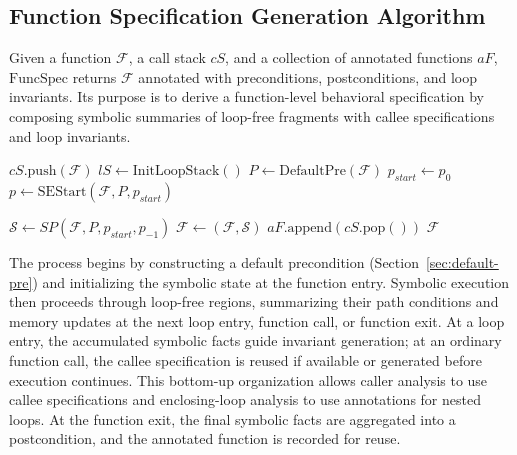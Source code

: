   \subsection{Function Specification Generation Algorithm}
  \label{sec:functionsummary}

  {Given a function $\mathcal F$, a call stack $\textit{cS}$, and a collection of annotated functions $\textit{aF}$, $\mathrm{FuncSpec}$ returns $\mathcal F$ annotated with preconditions, postconditions, and loop invariants. Its purpose is to derive a function-level behavioral specification by composing symbolic summaries of loop-free fragments with callee specifications and loop invariants.}

  \begin{algorithm}[htbp]
  \caption{Function Specification Generation $\mathrm{FuncSpec}$}
  \label{alg:funspec-gen}
  \small


  $\textit{cS}.\mathrm{push}(\mathcal{F})$\;
  $\textit{lS} \gets \mathrm{InitLoopStack}()$\;
  $P \gets \mathrm{DefaultPre}(\mathcal{F})$\;
  $p_{\textit{start}} \gets p_0$\;
  $p \gets \mathrm{SEStart}(\mathcal{F},P, p_{\textit{start}})$\;


  $\mathcal{S} \gets \textit{SP}(\mathcal{F},P,p_{\textit{start}},p_{-1})$\;
  $\mathcal{F} \gets (\mathcal{F},\mathcal{S})$\;
  $\textit{aF}.\mathrm{append}(\textit{cS}.\mathrm{pop}())$\;
  \Return $\mathcal{F}$\;
  \end{algorithm}

  {The process begins by constructing a default precondition (Section~\ref{sec:default-pre}) and initializing the symbolic state at the function entry. Symbolic execution then proceeds through loop-free regions, summarizing their path conditions and memory updates at the next loop entry, function call, or function exit. At a loop entry, the accumulated symbolic facts guide invariant generation; at an ordinary function call, the callee specification is reused if available or generated before execution continues. This bottom-up organization allows caller analysis to use callee specifications and enclosing-loop analysis to use annotations for nested loops. At the function exit, the final symbolic facts are aggregated into a postcondition, and the annotated function is recorded for reuse.}

